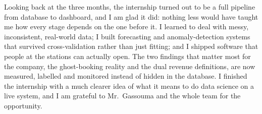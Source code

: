 \documentclass[11pt,a4paper]{article}
\begin{document}
Looking back at the three months, the internship turned out to be a full pipeline
from database to dashboard, and I am glad it did: nothing less would have taught me
how every stage depends on the one before it. I learned to deal with messy,
inconsistent, real-world data; I built forecasting and anomaly-detection systems that
survived cross-validation rather than just fitting; and I shipped software that
people at the stations can actually open. The two findings that matter most for the
company, the ghost-booking reality and the dual revenue definitions, are now
measured, labelled and monitored instead of hidden in the database. I finished the
internship with a much clearer idea of what it means to do data science on a live
system, and I am grateful to Mr.\ Gassouma and the whole team for the opportunity.
\end{document}
